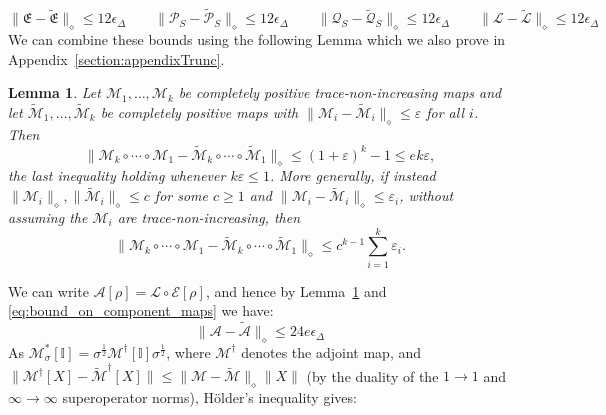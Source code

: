 \documentclass[aps,floatfix,10pt,amssymb,amsfont,amsmath,superscriptaddress,float,nofootinbib,longbibliography,nobalancelastpage,twocolumn]{revtex4-2}
\newtheorem{lemma}{Lemma}
\begin{document}
\begin{equation}
    \|\mathfrak{E} - \tilde{\mathfrak{E}}\|_{\diamond} \leq 12\epsilon_{\Delta} \qquad\|\mathcal{P}_S - \tilde{\mathcal{P}}_S\|_{\diamond} \leq 12\epsilon_{\Delta} \qquad\|\mathcal{Q}_S - \tilde{\mathcal{Q}}_S\|_{\diamond} \leq 12\epsilon_{\Delta} \qquad\|\mathcal{L} - \tilde{\mathcal{L}}\|_{\diamond} \leq 12\epsilon_{\Delta}
    \label{eq:bound_on_component_maps}
\end{equation}
We can combine these bounds using the following Lemma which we also prove in Appendix~\ref{section:appendixTrunc}.
\begin{lemma}
\label{lemma:composition}
Let $\mathcal{M}_1, \ldots, \mathcal{M}_k$ be completely positive trace-non-increasing maps and let $\tilde{\mathcal{M}}_1, \ldots, \tilde{\mathcal{M}}_k$ be completely positive maps with $\|\mathcal{M}_i - \tilde{\mathcal{M}}_i\|_{\diamond} \leq \varepsilon$ for all $i$. Then
\begin{equation}
    \|\mathcal{M}_k \circ \cdots \circ \mathcal{M}_1 - \tilde{\mathcal{M}}_k \circ \cdots \circ \tilde{\mathcal{M}}_1\|_{\diamond} \leq (1+\varepsilon)^k - 1 \leq e k \varepsilon,
\end{equation}
the last inequality holding whenever $k\varepsilon \leq 1$. More generally, if instead $\|\mathcal{M}_i\|_{\diamond}, \|\tilde{\mathcal{M}}_i\|_{\diamond} \leq c$ for some $c \geq 1$ and $\|\mathcal{M}_i - \tilde{\mathcal{M}}_i\|_{\diamond} \leq \varepsilon_i$, without assuming the $\mathcal{M}_i$ are trace-non-increasing, then
\begin{equation}
    \|\mathcal{M}_k \circ \cdots \circ \mathcal{M}_1 - \tilde{\mathcal{M}}_k \circ \cdots \circ \tilde{\mathcal{M}}_1\|_{\diamond} \leq c^{k-1}\sum_{i=1}^{k}\varepsilon_i .
\end{equation}
\end{lemma}
We can write $\mathcal{A}[\rho] = \mathcal{L} \circ \mathcal{E}[\rho]$, and hence by Lemma~\ref{lemma:composition} and \eqref{eq:bound_on_component_maps} we have:
\begin{equation}
    \|\mathcal{A} - \tilde{\mathcal{A}}\|_{\diamond} \leq 24e \epsilon_{\Delta}
\end{equation}
As $\mathcal{M}^*_{\sigma}[\mathbb{I}] = \sigma^{\frac{1}{2}}\mathcal{M}^{\dagger}[\mathbb{I}]\sigma^{\frac{1}{2}}$, where $\mathcal{M}^{\dagger}$ denotes the adjoint map, and $\|\mathcal{M}^{\dagger}[X] - \tilde{\mathcal{M}}^{\dagger}[X]\| \leq \|\mathcal{M}-\tilde{\mathcal{M}}\|_{\diamond}\|X\|$ (by the duality of the $1\to1$ and $\infty\to\infty$ superoperator norms), H\"older's inequality gives:
\end{document}
